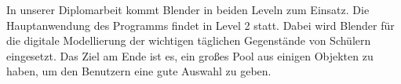 In unserer Diplomarbeit kommt Blender in beiden Leveln zum Einsatz. Die Hauptanwendung des Programms findet in Level 2 statt. Dabei wird Blender für die digitale Modellierung der wichtigen täglichen Gegenstände von Schülern eingesetzt. Das Ziel am Ende ist es, ein großes Pool aus einigen Objekten zu haben, um den Benutzern eine gute Auswahl zu geben.
